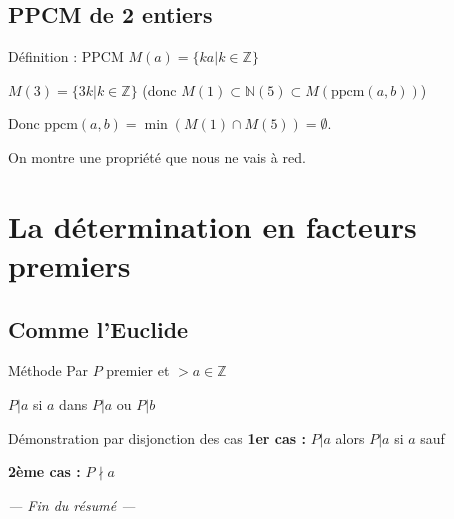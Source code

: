 \documentclass[a4paper,11pt]{article}
\begin{document}
\subsection{PPCM de 2 entiers}

\begin{defbox}{Définition : PPCM}
$M(a) = \{ka | k \in \mathbb{Z}\}$

$M(3) = \{3k | k \in \mathbb{Z}\}$ (donc $M(1) \subset \mathbb{N}(5) \subset M(\text{ppcm}(a, b))$)

Donc $\text{ppcm}(a, b) = \min(M(1) \cap M(5)) = \emptyset$.

On montre une propriété que nous ne vais à red.
\end{defbox}

\newpage
\section{La détermination en facteurs premiers}

\subsection{Comme l'Euclide}

\begin{methodbox}{Méthode}
Par $P$ premier et $> a \in \mathbb{Z}$

$P | a$ si $a$ dans $P | a$ ou $P | b$
\end{methodbox}

\begin{methodbox}{Démonstration par disjonction des cas}
\textbf{1er cas :} $P | a$ alors $P | a$ si $a$ sauf

\textbf{2ème cas :} $P \nmid a$
\end{methodbox}

\vspace{1cm}
\begin{center}
\textit{--- Fin du résumé ---}
\end{center}
\end{document}
